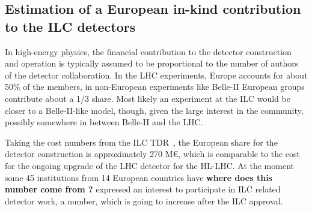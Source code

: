 \documentclass[%
 reprint,
 amsmath,amssymb,
 aps,
]{revtex4-1}
\begin{document}
\subsection{\label{Section:constructionmodel:ILCDet} Estimation of a
European in-kind contribution to the ILC detectors}

In high-energy physics, the financial contribution to the detector
construction and operation
is typically assumed to be proportional to the number of authors of
the detector collaboration. In the LHC experiments, Europe accounts for about 50\% of the members, in non-European experiments like Belle-II European groups contribute about a 1/3 share. Most likely an experiment at the ILC would be closer to a Belle-II-like model, though, given the large interest in the community, possibly somewhere in between Belle-II and the LHC. 

Taking the cost numbers from the ILC TDR~\cite{Behnke:2013lya}, the European share for the detector construction is approximately 270 M\euro{}, which is comparable to the cost for the ongoing upgrade of the LHC detector for the HL-LHC. At the moment some 45 institutions from 14 European countries have {\bfseries where does this number come from ?} expressed an interest to participate in ILC related detector work, a number, which is going to increase after the ILC approval.


\end{document}
